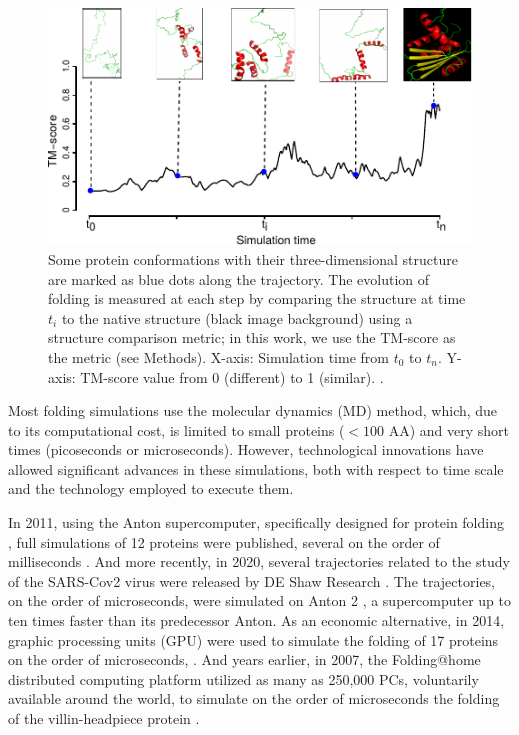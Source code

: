 \documentclass[twocolumn]{bmcart}%
\begin{document}
\begin{figure}[th]
\includegraphics[viewport=0bp 0bp 224bp 125bp]{images/01-trajectory-description-2RN2-pdbs}

\caption{ Some protein conformations with their three-dimensional structure are marked as blue dots along the trajectory. The evolution of folding is measured at each step by comparing the structure at time $t_{i}$ to the native structure (black image background) using a structure comparison metric; in this work, we use the TM-score as the metric (see Methods). X-axis: Simulation time from $t_{0}$ to $t_{n}$. Y-axis: TM-score value from 0 (different) to 1 (similar). \label{fig:Folding-Trajectory}. }
\end{figure}

Most folding simulations use the molecular dynamics (MD) method, which, due to its computational cost, is limited to small proteins ($<100$ AA) and very short times (picoseconds or microseconds). However, technological innovations have allowed significant advances in these simulations, both with respect to time scale and the technology employed to execute them.

In 2011, using the Anton supercomputer, specifically designed for protein folding \cite{Shaw2008}, full simulations of 12 proteins were published, several on the order of milliseconds \cite{Shaw2011}. And more recently, in 2020, several trajectories related to the study of the SARS-Cov2 virus were released by DE Shaw Research \cite{Shaw2020}. The trajectories, on the order of microseconds, were simulated on Anton 2 \cite{Shaw2014}, a supercomputer up to ten times faster than its predecessor Anton. As an economic alternative, in 2014, graphic processing units (GPU) were used to simulate the folding of 17 proteins on the order of microseconds, \cite{Nguyen2014}. And years earlier, in 2007, the Folding@home distributed computing platform utilized as many as 250,000 PCs, voluntarily available around the world, to simulate on the order of microseconds the folding of the villin-headpiece protein \cite{Larson2009}.
\end{document}
